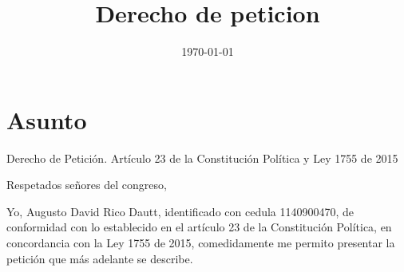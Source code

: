 \documentclass{article}
\title{Derecho de peticion}
\author{ }
\date{\today}
\begin{document}
\maketitle

\section{Asunto}
\begin{flushleft}


    Derecho de Petición. Artículo 23 de la Constitución Política y Ley 1755 de 2015

    Respetados señores del congreso,

    Yo, Augusto David Rico Dautt, identificado con cedula 1140900470, de conformidad con lo establecido en el artículo 23 de la Constitución Política, en concordancia con la Ley 1755 de 2015, comedidamente me permito presentar la petición que más adelante se describe.

    
\end{flushleft}
\end{document}
